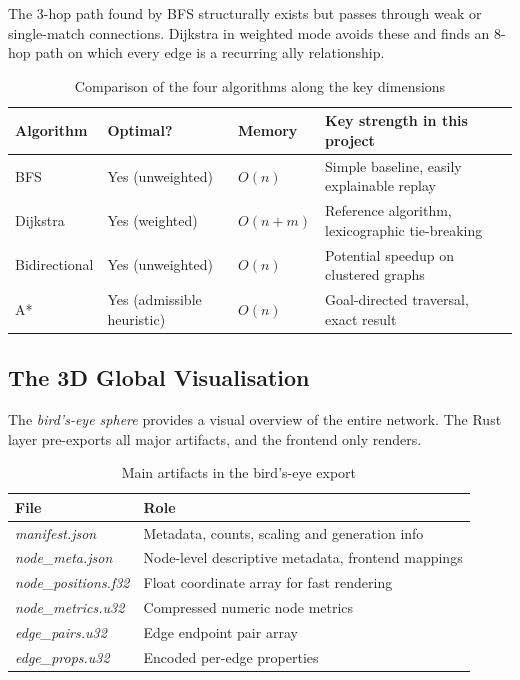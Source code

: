 The 3-hop path found by BFS structurally exists but passes through weak or single-match connections. Dijkstra in weighted mode avoids these and finds an 8-hop path on which every edge is a recurring ally relationship.

\begin{table}[H]
\centering
\caption{Comparison of the four algorithms along the key dimensions}
\begin{tabularx}{\textwidth}{|>{\raggedright\arraybackslash}p{3cm}|>{\raggedright\arraybackslash}p{2.5cm}|>{\raggedright\arraybackslash}X|>{\raggedright\arraybackslash}X|}
\hline
\textbf{Algorithm} & \textbf{Optimal?} & \textbf{Memory} & \textbf{Key strength in this project} \\
\hline
BFS & Yes (unweighted) & $O(n)$ & Simple baseline, easily explainable replay \\
Dijkstra & Yes (weighted) & $O(n + m)$ & Reference algorithm, lexicographic tie-breaking \\
Bidirectional & Yes (unweighted) & $O(n)$ & Potential speedup on clustered graphs \\
A* & Yes (admissible heuristic) & $O(n)$ & Goal-directed traversal, exact result \\
\hline
\end{tabularx}
\end{table}

\subsection{The 3D Global Visualisation}

The \textit{bird's-eye sphere} provides a visual overview of the entire network. The Rust layer pre-exports all major artifacts, and the frontend only renders.

\begin{table}[H]
\centering
\caption{Main artifacts in the bird's-eye export}
\begin{tabularx}{\textwidth}{|>{\raggedright\arraybackslash}p{4.2cm}|X|}
\hline
\textbf{File} & \textbf{Role} \\
\hline
\textit{manifest.json} & Metadata, counts, scaling and generation info \\
\textit{node\_meta.json} & Node-level descriptive metadata, frontend mappings \\
\textit{node\_positions.f32} & Float coordinate array for fast rendering \\
\textit{node\_metrics.u32} & Compressed numeric node metrics \\
\textit{edge\_pairs.u32} & Edge endpoint pair array \\
\textit{edge\_props.u32} & Encoded per-edge properties \\
\hline
\end{tabularx}
\end{table}

